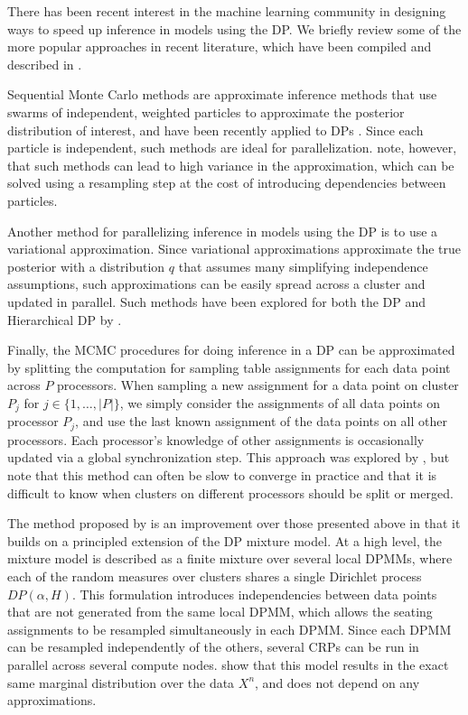 There has been recent interest in the machine learning community in
designing ways to speed up inference in models using the DP. We
briefly review some of the more popular approaches in recent
literature, which have been compiled and described in
\cite{williamson2013}.

Sequential Monte Carlo methods are approximate inference methods that
use swarms of independent, weighted particles to approximate the
posterior distribution of interest, and have been recently applied to
DPs \cite{fearnhead2004, ulker2010, rodriguez2011, ahmed2011}. Since
each particle is independent, such methods are ideal for
parallelization. \cite{williamson2013} note, however, that such
methods can lead to high variance in the approximation, which can be
solved using a resampling step at the cost of introducing dependencies
between particles.

Another method for parallelizing inference in models using the DP is
to use a variational approximation. Since variational approximations
approximate the true posterior with a distribution $q$ that assumes
many simplifying independence assumptions, such approximations can be
easily spread across a cluster and updated in parallel. Such methods
have been explored for both the DP and Hierarchical DP by
\cite{blei2004, kurihara2007, teh2008, wang2011}.

Finally, the MCMC procedures for doing inference in a DP can be
approximated by splitting the computation for sampling table
assignments for each data point across $P$ processors. When sampling a
new assignment for a data point on cluster $P_j$ for $j \in \{1,
\ldots, |P|\}$, we simply consider the assignments of all data points
on processor $P_j$, and use the last known assignment of the data
points on all other processors. Each processor's knowledge of other
assignments is occasionally updated via a global synchronization
step. This approach was explored by \cite{asuncion2008}, but
\cite{williamson2013} note that this method can often be slow to
converge in practice and that it is difficult to know when clusters on
different processors should be split or merged.

The method proposed by \cite{williamson2013} is an improvement over
those presented above in that it builds on a principled extension of
the DP mixture model. At a high level, the mixture model is described
as a finite mixture over several local DPMMs, where each of the random
measures over clusters shares a single Dirichlet process $DP(\alpha,
H)$. This formulation introduces independencies between data points
that are not generated from the same local DPMM, which allows the
seating assignments to be resampled simultaneously in each DPMM. Since
each DPMM can be resampled independently of the others, several CRPs
can be run in parallel across several compute
nodes. \cite{williamson2013} show that this model results in the exact
same marginal distribution over the data $X^n$, and does not depend on
any approximations.

